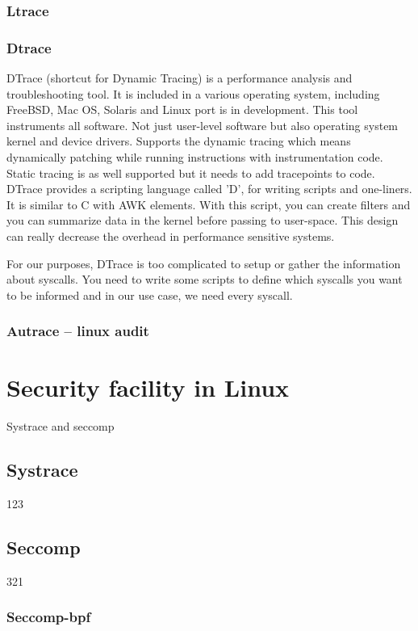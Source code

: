 \subsection{Ltrace}
\subsection{Dtrace}
DTrace (shortcut for Dynamic Tracing) is a performance analysis and troubleshooting tool.
It is included in a various operating system, including FreeBSD, Mac OS, Solaris and Linux port is in development.
This tool instruments all software. Not just user-level software but also operating system kernel and device drivers.
Supports the dynamic tracing which means dynamically patching while running instructions with instrumentation code.
Static tracing is as well supported but it needs to add tracepoints to code.
DTrace provides a scripting language called 'D', for writing scripts and one-liners.
It is similar to C with AWK elements.
With this script, you can create filters and you can summarize data in the kernel before passing to user-space.
This design can really decrease the overhead in performance sensitive systems.

For our purposes, DTrace is too complicated to setup or gather the information about syscalls. You need to write some scripts to define which syscalls you want to be informed and in our use case, we need every syscall.

\subsection{Autrace -- linux audit}

\chapter{Security facility in Linux}
Systrace and seccomp\cite{Pravidla}
\section{Systrace}
123

\section{Seccomp}
321
\subsection{Seccomp-bpf}

